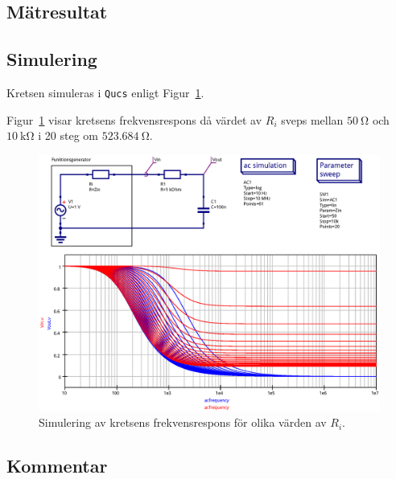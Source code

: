 \subsection{Mätresultat}\label{}


\subsection{Simulering}\label{}
Kretsen simuleras i \texttt{Qucs} enligt Figur~\ref{fig:Zin-step}.

Figur~\ref{fig:Zin-step} visar kretsens frekvensrespons då värdet av $R_i$ sveps mellan
$\SI{50}{\ohm}$ och $\SI{10}{\kohm}$ i 20 steg om $\SI{523.684}{\ohm}$.



\begin{figure}[ht]\label{fig:Zin-step}
  \centering
  \includegraphics[width=\linewidth]{sim/ee466_lab-4_prj/uppgift-3_Zin_step}
  \caption[] {Simulering av kretsens frekvensrespons för olika värden av $R_i$.}
\end{figure}


\subsection{Kommentar}\label{}


